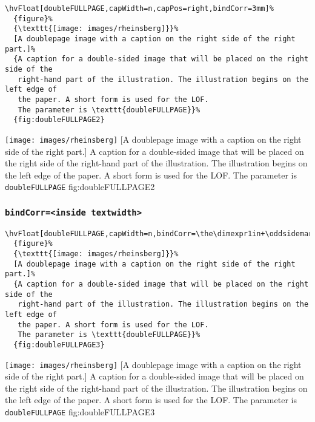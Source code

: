 \documentclass[twoside]{scrartcl}
\makeatletter
\let\hvBlindtext\Blindtext
\def\Blindtext{\par\color{black!40}\hvBlindtext\par\normalcolor}
\def\hvblindtext{\textcolor{black!40}{\blindtext@text}}
\makeatother
\begin{document}
\begin{lstlisting}
\hvFloat[doubleFULLPAGE,capWidth=n,capPos=right,bindCorr=3mm]%
  {figure}%
  {\texttt{[image: images/rheinsberg]}}%
  [A doublepage image with a caption on the right side of the right part.]%
  {A caption for a double-sided image that will be placed on the right side of the
   right-hand part of the illustration. The illustration begins on the left edge of 
   the paper. A short form is used for the LOF. 
   The parameter is \texttt{doubleFULLPAGE}}%
  {fig:doubleFULLPAGE2}
\end{lstlisting}

%
  {\texttt{[image: images/rheinsberg]}}%
  [A doublepage image with a caption on the right side of the right part.]%
  {A caption for a double-sided image that will be placed on the right side of the
   right-hand part of the illustration. The illustration begins on the left edge of 
   the paper. A short form is used for the LOF. 
   The parameter is \texttt{doubleFULLPAGE}}%
  {fig:doubleFULLPAGE2}



\Blindtext

\Blindtext

\hvblindtext

\hvblindtext

\subsubsection{\texttt{bindCorr=<inside textwidth>}}

\begin{lstlisting}
\hvFloat[doubleFULLPAGE,capWidth=n,bindCorr=\the\dimexpr1in+\oddsidemargin]%
  {figure}%
  {\texttt{[image: images/rheinsberg]}}%
  [A doublepage image with a caption on the right side of the right part.]%
  {A caption for a double-sided image that will be placed on the right side of the
   right-hand part of the illustration. The illustration begins on the left edge of 
   the paper. A short form is used for the LOF. 
   The parameter is \texttt{doubleFULLPAGE}}%
  {fig:doubleFULLPAGE3}
\end{lstlisting}

%
  {\texttt{[image: images/rheinsberg]}}%
  [A doublepage image with a caption on the right side of the right part.]%
  {A caption for a double-sided image that will be placed on the right side of the
   right-hand part of the illustration. The illustration begins on the left edge of 
   the paper. A short form is used for the LOF. 
   The parameter is \texttt{doubleFULLPAGE}}%
  {fig:doubleFULLPAGE3}
\end{document}

